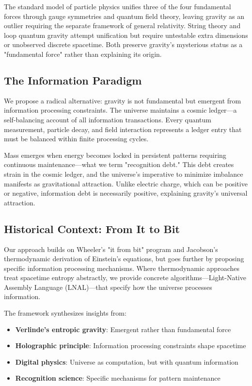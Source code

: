 \documentclass[12pt]{article}
\begin{document}
The standard model of particle physics unifies three of the four fundamental forces through gauge symmetries and quantum field theory, leaving gravity as an outlier requiring the separate framework of general relativity. String theory and loop quantum gravity attempt unification but require untestable extra dimensions or unobserved discrete spacetime. Both preserve gravity's mysterious status as a "fundamental force" rather than explaining its origin.

\subsection{The Information Paradigm}

We propose a radical alternative: gravity is not fundamental but emergent from information processing constraints. The universe maintains a cosmic ledger—a self-balancing account of all information transactions. Every quantum measurement, particle decay, and field interaction represents a ledger entry that must be balanced within finite processing cycles.

Mass emerges when energy becomes locked in persistent patterns requiring continuous maintenance—what we term "recognition debt." This debt creates strain in the cosmic ledger, and the universe's imperative to minimize imbalance manifests as gravitational attraction. Unlike electric charge, which can be positive or negative, information debt is necessarily positive, explaining gravity's universal attraction.

\subsection{Historical Context: From It to Bit}

Our approach builds on Wheeler's "it from bit" program and Jacobson's thermodynamic derivation of Einstein's equations, but goes further by proposing specific information processing mechanisms. Where thermodynamic approaches treat spacetime entropy abstractly, we provide concrete algorithms—Light-Native Assembly Language (LNAL)—that specify how the universe processes information.

The framework synthesizes insights from:
\begin{itemize}
\item \textbf{Verlinde's entropic gravity}: Emergent rather than fundamental force
\item \textbf{Holographic principle}: Information processing constraints shape spacetime
\item \textbf{Digital physics}: Universe as computation, but with quantum information
\item \textbf{Recognition science}: Specific mechanisms for pattern maintenance
\end{itemize}
\end{document}
